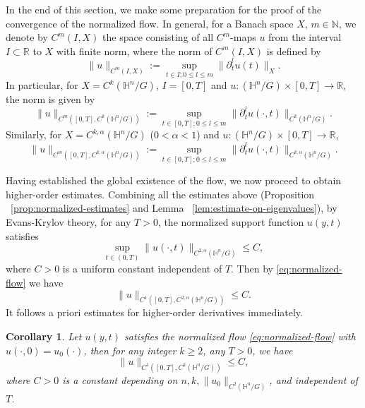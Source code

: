 \documentclass[reqno]{amsart}
\newtheorem{corollary}[theorem]{Corollary}
\theoremstyle{remark}
\newcommand{\R}{\ensuremath{\mathbb{R}}}
\newcommand{\N}{\ensuremath{\mathbb{N}}}
\renewcommand{\H}{{\mathbb{H}}}
\theoremstyle{definition}
\numberwithin{equation}{section}
\begin{document}
In the end of this section, we make some preparation for the proof of the convergence of the normalized flow. In general, for a Banach space \(X\), \(m\in \N\), we denote by \(C^{m}(I,X)\) the space consisting of all \(C^{m}\)-maps \(u\) from the interval \(I \subset \mathbb{R}\) to \(X\) with finite norm, where the norm of \(C^{m}(I,X)\) is defined by 
\begin{equation}
    \|u\|_{C^{m}(I,X)} := \sup_{t\in I ; 0\leq l \leq m}\|\partial_t^{l}u(t)\|_{X}.
\end{equation} 
In particular, for \(X = C^{k}(\H^n / G)\), \(I = [0,T]\) and \(u: (\H^n / G)\times [0,T] \to \R\), the norm is given by
\begin{equation}
    \|u\|_{C^{m}\left([0,T],C^{k}(\H^n / G)\right)} := \sup_{t\in[0,T] ; 0\leq l \leq m}\|\partial_t^{l}u(\cdot,t)\|_{C^{k}(\H^n / G)}.
\end{equation}
Similarly, for \(X = C^{k,\alpha}(\H^n / G)\) (\(0 < \alpha < 1\)) and \(u: (\H^n / G)\times [0,T] \to \R\),
\begin{equation}
    \|u\|_{C^{m}\left([0,T],C^{k,\alpha}(\H^n / G)\right)} := \sup_{t\in[0,T] ; 0\leq l \leq m}\|\partial_t^{l}u(\cdot,t)\|_{C^{k,\alpha}(\H^n / G)}.
\end{equation}
\par Having established the global existence of the flow, we now proceed to obtain higher-order estimates. Combining all the estimates above (Proposition ~\ref{prop:normalized-estimates} and Lemma ~\ref{lem:estimate-on-eigenvalues}), by Evans-Krylov theory, for any \(T > 0\), the normalized support function \(u(y,t)\) satisfies
\[ \sup_{t\in(0,T)}\|u(\cdot,t)\|_{C^{2,\alpha}(\H^n / G)} \leq C, \] 
where \(C>0\) is a uniform constant independent of \(T\). Then by \eqref{eq:normalized-flow} we have 
\begin{equation}
    \|u\|_{C^{1}\left([0,T],C^{2,\alpha}(\H^n / G)\right)} \leq C.
\end{equation}
It follows a priori estimates for higher-order derivatives immediately. 
\begin{corollary}\label{cor:higer-order estimates}
    Let \(u(y,t)\) satisfies the normalized flow \eqref{eq:normalized-flow} with \(u(\cdot,0) = u_0(\cdot)\), then for any integer \(k\geq 2\), any \(T > 0\), we have
    \begin{equation}
        \|u\|_{C^{1}([0,T],C^{k}(\H^n / G))} \leq C,
    \end{equation}
    where \(C > 0\) is a constant depending on \(n,k,\|u_0\|_{C^{2}(\H^n / G)}\), and independent of \(T\).
\end{corollary}
\end{document}

